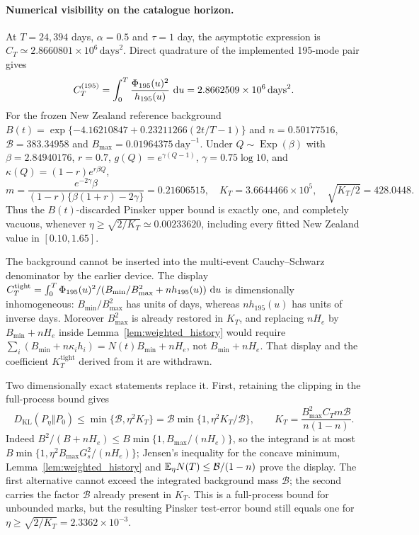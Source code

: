 \paragraph{Numerical visibility on the catalogue horizon.}
At $T=24{,}394$ days, $\alpha=0.5$ and $\tau=1$ day, the asymptotic expression
is $C_T\simeq2.8660801\times10^{6}\,\mathrm{days}^2$.
Direct quadrature of the implemented 195-mode pair gives
\[
 C_T^{(195)}=\int_0^T\frac{\Phi_{195}(u)^2}{h_{195}(u)}\,\mathop{}\!\mathrm{d} u
 =2.8662509\times10^{6}\,\mathrm{days}^2.
\]
For the frozen New Zealand reference background
$B(t)=\exp\{-4.16210847+0.23211266(2t/T-1)\}$ and $n=0.50177516$,
$\mathcal B=383.34958$ and $B_{\max}=0.01964375\,\mathrm{day}^{-1}$.
Under $Q\sim\operatorname{Exp}(\beta)$ with $\beta=2.84940176$, $r=0.7$,
$g(Q)=e^{\gamma(Q-1)}$, $\gamma=0.75\log10$, and
$\kappa(Q)=(1-r)e^{r\beta Q}$,
\[
 m=\frac{e^{-2\gamma}\beta}{(1-r)\{\beta(1+r)-2\gamma\}}
 =0.21606515,\quad
 K_T=3.6644466\times10^{5},\quad \sqrt{K_T/2}=428.0448.
\]
Thus the $B(t)$-discarded Pinsker upper bound is exactly one, and completely
vacuous, whenever $\eta\geq\sqrt{2/K_T}\simeq0.00233620$, including every fitted
New Zealand value in $[0.10,1.65]$.

The background cannot be inserted into the multi-event Cauchy--Schwarz
denominator by the earlier device. The display
\(C_T^{\mathrm{tight}}=\int_0^T\Phi_{195}(u)^2/(B_{\min}/B_{\max}^2+n h_{195}(u))\,\mathop{}\!\mathrm{d} u\)
is dimensionally inhomogeneous: \(B_{\min}/B_{\max}^2\) has units of days,
whereas \(n h_{195}(u)\) has units of inverse days. Moreover \(B_{\max}^2\) is
already restored in \(K_T\), and replacing \(nH_e\) by \(B_{\min}+nH_e\) inside
Lemma~\ref{lem:weighted_history} would require
\(\sum_i(B_{\min}+n\kappa_ih_i)=N(t)B_{\min}+nH_e\), not \(B_{\min}+nH_e\).
That display and the coefficient \(K_T^{\mathrm{tight}}\) derived from it are
withdrawn.

Two dimensionally exact statements replace it. First, retaining the clipping in
the full-process bound gives
\[
D_{\mathrm{KL}}(P_\eta\Vert P_0)
\le \min\{\mathcal B,\eta^2K_T\}
= \mathcal B\min\{1,\eta^2K_T/\mathcal B\},
\qquad K_T=\frac{B_{\max}^2C_Tm\mathcal B}{n(1-n)}.
\]
Indeed \(B^2/(B+nH_e)\le B\min\{1,B_{\max}/(nH_e)\}\), so the integrand is at
most \(B\min\{1,\eta^2B_{\max}G_s^2/(nH_e)\}\); Jensen's inequality for the
concave minimum, Lemma~\ref{lem:weighted_history} and
\(\mathbb{E}_\eta N(T)\le\mathcal B/(1-n)\) prove the display. The first alternative
cannot exceed the integrated background mass \(\mathcal B\); the second carries
the factor \(\mathcal B\) already present in \(K_T\). This is a full-process
bound for unbounded marks, but the resulting Pinsker test-error bound still
equals one for \(\eta\ge\sqrt{2/K_T}=2.3362\times10^{-3}\).

